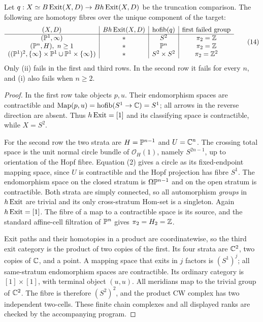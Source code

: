 \begin{example}\label{P1d2}
Let $q:X\simeq B\operatorname{Exit}(X,D)\to B h\operatorname{Exit}(X,D)$ be the truncation
comparison.  The following are homotopy fibres over the unique
component of the target:
\[
\begin{array}{c|c|c|c}
(X,D)&B h\operatorname{Exit}(X,D)&\operatorname{hofib}(q)&\text{first failed group}\\ \hline
(\mathbb P^1,\infty)& *&S^2&\pi_2=\mathbb Z\\
(\mathbb P^n,H),\ n\geq1& *&\mathbb P^n&\pi_2=\mathbb Z\\
((\mathbb P^1)^2,\{\infty\}\times\mathbb P^1\cup\mathbb P^1\times\{\infty\})
 & *&S^2\times S^2&\pi_2=\mathbb Z^2
\end{array}                                                   \tag{14}
\]
Only (ii) fails in the first and third rows.  In the second row it
fails for every $n$, and (i) also fails when $n\geq2$.
\end{example}
\begin{proof}
In the first row take objects $p,u$.  Their endomorphism spaces are
contractible and $\operatorname{Map}(p,u)=\operatorname{hofib}(S^1\to\mathbb C)=S^1$; all arrows
in the reverse direction are absent.  Thus $h\operatorname{Exit}=[1]$ and its
classifying space is contractible, while $X=S^2$.

For the second row the two strata are $H=\mathbb P^{n-1}$ and
$U=\mathbb C^n$.  The crossing total space is the unit normal circle
bundle of $\mathcal O_H(1)$, namely $S^{2n-1}$, up to orientation
of the Hopf fibre.  Equation (2) gives a circle as its fixed-endpoint
mapping space, since $U$ is contractible and the Hopf projection
has fibre $S^1$.  The endomorphism space on the closed stratum is
$\Omega\mathbb P^{n-1}$ and on the open stratum is contractible.  Both
strata are simply connected, so all automorphism \emph{groups} in
$h\operatorname{Exit}$ are trivial and its only cross-stratum Hom-set is a
singleton.  Again $h\operatorname{Exit}=[1]$.  The fibre of a map to a contractible
space is its source, and the standard affine-cell filtration of
$\mathbb P^n$ gives $\pi_2=H_2=\mathbb Z$.

Exit paths and their homotopies in a product are coordinatewise,
so the third exit category is the product of two copies of the
first.  Its four strata are $\mathbb C^2$, two copies of $\mathbb C$, and a
point.  A mapping space that exits in $j$ factors is $(S^1)^j$;
all same-stratum endomorphism spaces are contractible.  Its ordinary
category is $[1]\times[1]$, with terminal object $(u,u)$.
All meridians map to the trivial group of $\mathbb C^2$.
The fibre is therefore $(S^2)^2$, and the product CW complex has
two independent two-cells.  These finite chain complexes and all
displayed ranks are checked by the accompanying program.
\end{proof}

